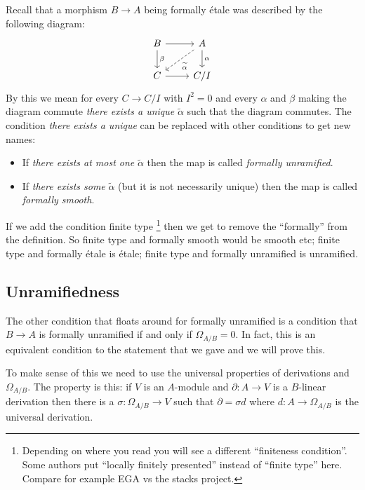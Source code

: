\documentclass[12pt]{article}
\numberwithin{equation}{section}
\theoremstyle{definition}
\theoremstyle{remark}
\begin{document}
Recall that a morphism $B \to A$ being formally \'etale was described by the following diagram:
$$ \begin{tikzcd}
B \ar[r] \ar[d, "\beta"] & A \ar[d,"\alpha"] \ar[dl, dashed, "\widetilde{\alpha}"] \\
C \ar[r] & C/I
\end{tikzcd}
$$
By this we mean for every $C\to C/I$ with $I^2=0$ and every $\alpha$ and $\beta$ making the diagram commute \emph{there exists a unique} $\widetilde{\alpha}$ such that the diagram commutes. 
The condition \emph{there exists a unique} can be replaced with other conditions to get new names:
\begin{itemize}
	\item If \emph{there exists at most one} $\widetilde{\alpha}$ then the map is called \emph{formally unramified}.
	\item If \emph{there exists some} $\widetilde{\alpha}$ (but it is not necessarily unique) then the map is called \emph{formally smooth}.
\end{itemize}
If we add the condition finite type \footnote{Depending on where you read you will see a different ``finiteness condition''. Some authors put ``locally finitely presented'' instead of ``finite type'' here.  Compare for example EGA vs the stacks project.} then we get to remove the ``formally'' from the definition. 
So finite type and formally smooth would be smooth etc; finite type and formally \'etale is \'etale; finite type and formally unramified is unramified. 

\subsection{Unramifiedness}
The other condition that floats around for formally unramified is a condition that $B\to A$ is formally unramified if and only if $\Omega_{A/B}=0$. 
In fact, this is an equivalent condition to the statement that we gave and we will prove this. 

To make sense of this we need to use the universal properties of derivations and $\Omega_{A/B}$. The property is this: if $V$ is an $A$-module and $\partial:A\to V$ is a $B$-linear derivation then there is a $\sigma: \Omega_{A/B} \to V$ such that $\partial = \sigma d$ where $d:A \to \Omega_{A/B}$ is the universal derivation.
\end{document}
